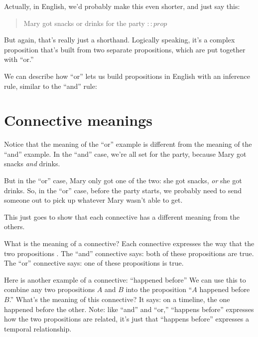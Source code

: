 \documentclass[../../../main.tex]{subfiles}
\begin{document}
\noindent
Actually, in English, we'd probably make this even shorter, and just say this:

\begin{quote}
  Mary got snacks or drinks for the party $:: prop$
\end{quote}

\noindent
But again, that's really just a shorthand. Logically speaking, it's a complex proposition that's built from two separate propositions, which are put together with ``or.''

We can describe how ``or'' lets us build propositions in English with an inference rule, similar to the ``and'' rule:

\begin{prooftree*}
\end{prooftree*}


\section{Connective meanings}

Notice that the meaning of the ``or'' example is different from the meaning of the ``and'' example. In the ``and'' case, we're all set for the party, because Mary got snacks \emph{and} drinks. 

But in the ``or'' case, Mary only got one of the two: she got snacks, \emph{or} she got drinks. So, in the ``or'' case, before the party starts, we probably need to send someone out to pick up whatever Mary wasn't able to get. 

This just goes to show that each connective has a different meaning from the others. 

What is the meaning of a connective? Each connective expresses the way that the two propositions . The ``and'' connective says: both of these propositions are true. The ``or'' connective says: one of these propositions is true.

Here is another example of a connective: ``happened before'' We can use this to combine any two propositions $A$ and $B$ into the proposition ``$A$ happened before $B$.'' What's the meaning of this connective? It says: on a timeline, the one happened before the other. Note: like ``and'' and ``or,'' ``happens before'' expresses how the two propositions are related, it's just that ``happens before'' expresses a temporal relationship.
\end{document}
